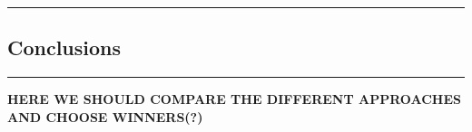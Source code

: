 {\color{gray}\hrule}
\begin{center}
\section{Conclusions}
\bigskip
\end{center}
{\color{gray}\hrule}
\vspace{0.5cm}
\textbf{HERE WE SHOULD COMPARE THE DIFFERENT APPROACHES AND CHOOSE WINNERS(?)}